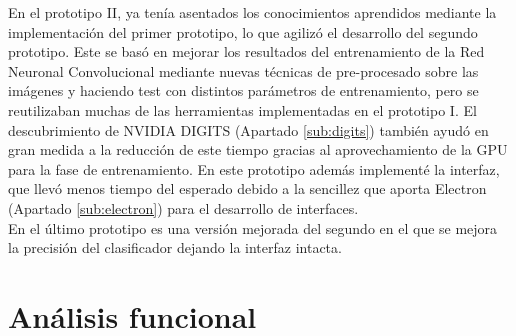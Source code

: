 \documentclass[a4paper,11pt]{book}
\begin{document}
En el prototipo II, ya tenía asentados los conocimientos aprendidos mediante la implementación del primer prototipo, lo que agilizó el desarrollo del segundo prototipo. Este se basó en mejorar los resultados del entrenamiento de la Red Neuronal Convolucional mediante nuevas técnicas de pre-procesado sobre las imágenes y haciendo test con distintos parámetros de entrenamiento, pero se reutilizaban muchas de las herramientas implementadas en el prototipo I. El descubrimiento de NVIDIA DIGITS (Apartado \ref{sub:digits}) también ayudó en gran medida a la reducción de este tiempo gracias al aprovechamiento de la GPU para la fase de entrenamiento. En este prototipo además implementé la interfaz, que llevó menos tiempo del esperado debido a la sencillez que aporta Electron (Apartado \ref{sub:electron}) para el desarrollo de interfaces.\\
En el último prototipo es una versión mejorada del segundo en el que se mejora la precisión del clasificador dejando la interfaz intacta.

\section{Análisis funcional}



\end{document}
